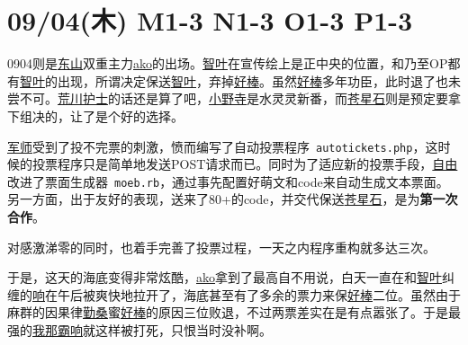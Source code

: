 \section{09/04(木) M1-3 N1-3 O1-3 P1-3}


0904则是\uline{东山}双重主力\uline{ako}的出场。\uline{智叶}在宣传绘上是正中央的位置，和乃至OP都有\uline{智叶}的出现，所谓决定保送\uline{智叶}，弃掉\uline{好棒}。虽然\uline{好棒}多年功臣，此时退了也未尝不可。\uline{荒川护士}的话还是算了吧，\uline{小野寺}是水灵灵新番，而\uline{苍星石}则是预定要拿下组决的，让了是个好的选择。

\uline{军师}受到了投不完票的刺激，愤而编写了自动投票程序~\verb`autotickets.php`，这时候的投票程序只是简单地发送POST请求而已。同时为了适应新的投票手段，\uline{自由}改进了票面生成器~\verb`moeb.rb`，通过事先配置好萌文和code来自动生成文本票面。另一方面，出于友好的表现，送来了80+的code，并交代保送\uline{苍星石}，是为\textbf{第一次合作}。

对感激涕零的同时，也着手完善了投票过程，一天之内程序重构就多达三次。

于是，这天的海底变得非常炫酷，\uline{ako}拿到了最高自不用说，白天一直在和\uline{智叶}纠缠的\uline{响}在午后被爽快地拉开了，海底甚至有了多余的票力来保\uline{好棒}二位。虽然由于麻群的因果律\uline{勤桑}蜜\uline{好棒}的原因三位败退，不过两票差实在是有点嚣张了。于是最强的\uline{我那霸响}就这样被打死，只恨当时没补啊。

